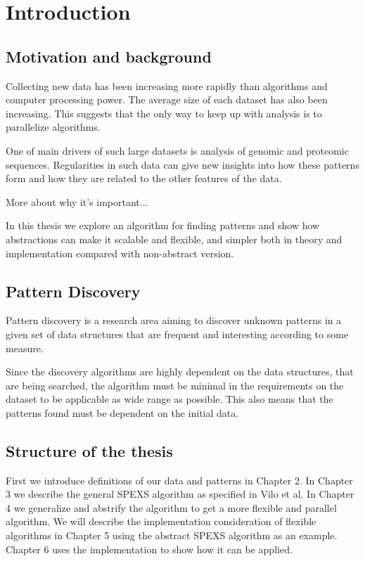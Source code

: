 \chapter{Introduction}

\section{Motivation and background}

Collecting new data has been increasing more rapidly than algorithms and
computer processing power. The average size of each dataset has also
been increasing. This suggests that the only way to keep up with
analysis is to parallelize algorithms.

One of main drivers of such large datasets is analysis
of genomic and proteomic sequences. Regularities in such data can 
give new insights into how these patterns form and how 
they are related to the other features of the data.

More about why it's important... 

In this thesis we explore an algorithm for finding patterns and show how
abstractions can make it scalable and flexible, and simpler both in 
theory and implementation compared with non-abstract version.

\section{Pattern Discovery}

Pattern discovery is a research area aiming to discover unknown patterns
in a given set of data structures that are frequent and interesting according 
to some measure.

Since the discovery algorithms are highly dependent on the
data structures, that are being searched, the algorithm must be minimal
in the requirements on the dataset to be applicable as wide range as possible.
This also means that the patterns found must be dependent on the initial data.

\section{Structure of the thesis}

First we introduce definitions of our data and patterns in Chapter 2. In
Chapter 3 we describe the general SPEXS algorithm as specified in Vilo et al.
In Chapter 4 we generalize and abstrify the algorithm to get a more flexible
and parallel algorithm. We will describe the implementation consideration of
flexible algorithms in Chapter 5 using the abstract SPEXS algorithm as an
example. Chapter 6 uses the implementation to show how it can be applied.